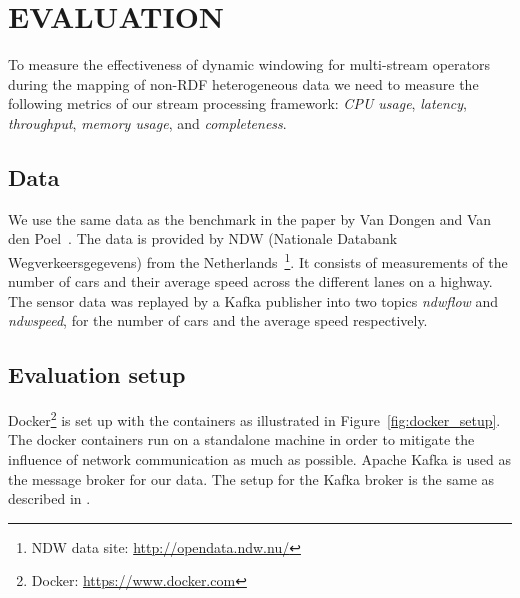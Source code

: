 \section{EVALUATION}
\label{chap:Evaluation}

To measure the effectiveness of dynamic windowing for multi-stream operators during the 
mapping of non-RDF heterogeneous data we need to measure the following 
metrics of our stream processing framework: \emph{CPU usage}, \emph{latency}, \emph{throughput},
\emph{memory usage}, and \emph{completeness}. 

\subsection{Data}
We use the same data 
as the benchmark in the paper by Van Dongen and Van den Poel~\cite{evalution_of_spe}. 
The data is provided by NDW (Nationale Databank Wegverkeersgegevens) from the 
Netherlands~\footnote{NDW data site: \href{http://opendata.ndw.nu/}{http://opendata.ndw.nu/} }.
It consists of measurements of the number of cars and their average speed across the different 
lanes on a highway. 
The sensor data was replayed by a Kafka publisher into two topics 
\emph{ndwflow} and \emph{ndwspeed}, for the number of cars and the average speed respectively.

\subsection{Evaluation setup}

Docker\footnote{Docker: \url{https://www.docker.com}} is 
set up with the containers 
as illustrated in Figure~\ref{fig:docker_setup}. The docker containers 
run on a standalone machine in order to mitigate the influence of 
network communication as much as possible. Apache Kafka is used 
as the message broker for our data. The setup for the Kafka broker is 
the same as described in \cite{evalution_of_spe}. 



